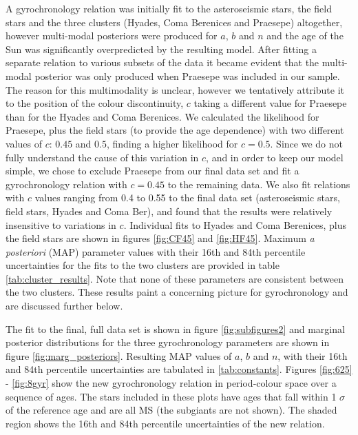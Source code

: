 \documentclass[10pt,preprint]{aastex}
\begin{document}
A gyrochronology relation was initially fit to the asteroseismic stars, the field stars and the three clusters (Hyades, Coma Berenices and Praesepe) altogether, however multi-modal posteriors were produced for $a$, $b$ and $n$ and the age of the Sun was significantly overpredicted by the resulting model.
After fitting a separate relation to various subsets of the data it became evident that the multi-modal posterior was only produced when Praesepe was included in our sample.
The reason for this multimodality is unclear, however we tentatively attribute it to the position of the colour discontinuity, $c$ taking a different value for Praesepe than for the Hyades and Coma Berenices.
We calculated the likelihood for Praesepe, plus the field stars (to provide the age dependence) with two different values of $c$: $0.45$ and $0.5$, finding a higher likelihood for $c=0.5$.
Since we do not fully understand the cause of this variation in $c$, and in order to keep our model simple, we chose to exclude Praesepe from our final data set and fit a gyrochronology relation with $c=0.45$ to the remaining data.
We also fit relations with $c$ values ranging from 0.4 to 0.55 to the final data set (asteroseismic stars, field stars, Hyades and Coma Ber), and found that the results were relatively insensitive to variations in $c$.
Individual fits to Hyades and Coma Berenices, plus the field stars are shown in figures \ref{fig:CF45} and \ref{fig:HF45}.
Maximum {\it a posteriori} (MAP) parameter values with their 16th and 84th percentile uncertainties for the fits to the two clusters are provided in table \ref{tab:cluster_results}.
Note that none of these parameters are consistent between the two clusters.
These results paint a concerning picture for gyrochronology and are discussed further below.

The fit to the final, full data set is shown in figure \ref{fig:subfigures2} and marginal posterior distributions for the three gyrochronology parameters are shown in figure \ref{fig:marg_posteriors}.
Resulting MAP values of $a$, $b$ and $n$, with their 16th and 84th percentile uncertainties are tabulated in \ref{tab:constants}.
Figures \ref{fig:625} - \ref{fig:8gyr} show the new gyrochronology relation in period-colour space over a sequence of ages.
The stars included in these plots have ages that fall within 1 $\sigma$ of the reference age and are all MS (the subgiants are not shown).
The shaded region shows the 16th and 84th percentile uncertainties of the new relation.
\end{document}
